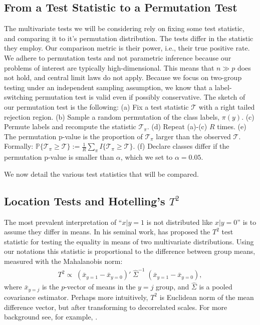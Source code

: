 \documentclass[12pt,a4paper]{article}
\begin{document}
\subsection{From a Test Statistic to a Permutation Test}

The multivariate tests we will be considering rely on fixing some test statistic, and comparing it to it's permutation distribution. 
The tests differ in the statistic they employ.
Our comparison metric is their power, i.e., their true positive rate. 
We adhere to permutation tests and not parametric inference because our problems of interest are typically high-dimensional. 
This means that $n \gg p$ does not hold, and central limit laws do not apply.
Because we focus on two-group testing under an independent sampling assumption, we know that a label-switching permutation test is valid even if possibly conservative. 
The sketch of our permutation test is the following: \newline
(a) Fix a test statistic $\mathcal{T}$ with a right tailed rejection region. \newline
(b) Sample a random permutation of the class labels, $\pi(y)$. \newline
(c) Permute labels and recompute the statistic $\mathcal{T}_\pi$. \newline
(d) Repeat (a)-(c) $R$ times. \newline
(e) The permutation p-value is the proportion of  $\mathcal{T}_\pi$ larger than the observed $\mathcal{T}$. Formally: 
$\mathbb{P}\{\mathcal{T}_\pi \geq \mathcal{T}\}:=\frac{1}{R} \sum_{\pi} I\{\mathcal{T}_\pi \geq \mathcal{T}\}$.\newline
(f) Declare classes differ if the permutation p-value is smaller than $\alpha$, which we set to $\alpha=0.05$.
\bigskip

We now detail the various test statistics that will be compared.


\subsection{Location Tests and Hotelling's $T^2$}
The most prevalent interpretation of ``$x|y=1$ is not distributed like $x|y=0$'' is to assume they differ in means. 
In his seminal work, \citet{hotelling_generalization_1931} has proposed the $T^2$ test statistic for testing the equality in means of two multivariate distributions. 
Using our notations this statistic is proportional to the difference between group means, measured with the Mahalanobis norm: 
\begin{align}
	T^2 \propto \; (\bar{x}_{y=1}-\bar{x}_{y=0})'\; \hat{\Sigma}^{-1} \;(\bar{x}_{y=1}-\bar{x}_{y=0}), 
\end{align}
where $\bar{x}_{y=j}$ is the $p$-vector of means in the $y=j$ group, and $\hat{\Sigma}$ is a pooled covariance estimator.
Perhaps more intuitively, $T^2$ is Euclidean norm of the mean difference vector, but after transforming to decorrelated scales. 
For more background see, for example, \cite{anderson_introduction_2003}.
\end{document}
